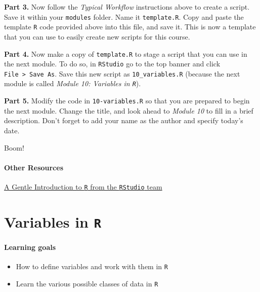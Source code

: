 \documentclass[
]{book}
\providecommand{\tightlist}{%
  \setlength{\itemsep}{0pt}\setlength{\parskip}{0pt}}
\begin{document}
\textbf{Part 3.} Now follow the \emph{Typical Workflow} instructions above to create a script. Save it within your \texttt{modules} folder. Name it \texttt{template.R}. Copy and paste the template \texttt{R} code provided above into this file, and save it. This is now a template that you can use to easily create new scripts for this course.

\textbf{Part 4.} Now make a copy of \texttt{template.R} to stage a script that you can use in the next module. To do so, in \texttt{RStudio} go to the top banner and click \texttt{File\ \textgreater{}\ Save\ As}. Save this new script as \texttt{10\_variables.R} (because the next module is called \emph{Module 10: Variables in \texttt{R}}).

\textbf{Part 5.} Modify the code in \texttt{10-variables.R} so that you are prepared to begin the next module. Change the title, and look ahead to \emph{Module 10} to fill in a brief description. Don't forget to add your name as the author and specify today's date.

Boom!

\hypertarget{other-resources-1}{%
\subsubsection*{Other Resources}\label{other-resources-1}}

\href{https://www.rstudio.com/resources/webinars/a-gentle-introduction-to-tidy-statistics-in-r/}{A Gentle Introduction to \texttt{R} from the \texttt{RStudio} team}

\hypertarget{variables-in-r}{%
\chapter{\texorpdfstring{Variables in \texttt{R}}{Variables in R}}\label{variables-in-r}}

\hypertarget{learning-goals-2}{%
\subsubsection*{Learning goals}\label{learning-goals-2}}

\begin{itemize}
\tightlist
\item
  How to define variables and work with them in \texttt{R}\\
\item
  Learn the various possible classes of data in \texttt{R}
\end{itemize}
\end{document}
